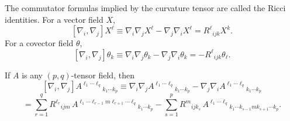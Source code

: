 \begin{remark}
\label{appa-rem-ricci-identities}

The commutator formulas implied by the curvature tensor are called the Ricci identities. For a vector field \(X\),
\[
[\nabla_i,\nabla_j]X^\ell \equiv \nabla_i\nabla_jX^\ell-\nabla_j\nabla_iX^\ell = R^\ell{}_{ijk}X^k.
\]
For a covector field \(\theta\),
\[
[\nabla_i,\nabla_j]\theta_k \equiv \nabla_i\nabla_j\theta_k-\nabla_j\nabla_i\theta_k = -R^\ell{}_{ijk}\theta_\ell.
\]
\end{remark}

\begin{remark}
\label{appa-rem-commutator-general-tensors}

If \(A\) is any \((p,q)\)-tensor field, then
\[
[\nabla_i,\nabla_j]A^{\ell_1\cdots \ell_q}{}_{k_1\cdots k_p}
\equiv \nabla_i\nabla_j A^{\ell_1\cdots \ell_q}{}_{k_1\cdots k_p}
-\nabla_j\nabla_i A^{\ell_1\cdots \ell_q}{}_{k_1\cdots k_p}
\]
\[
= \sum_{r=1}^q R^{\ell_r}{}_{ijm}\,A^{\ell_1\cdots \ell_{r-1}m\ell_{r+1}\cdots \ell_q}{}_{k_1\cdots k_p}
- \sum_{s=1}^p R^{m}{}_{ijk_s}\,A^{\ell_1\cdots \ell_q}{}_{k_1\cdots k_{s-1}mk_{s+1}\cdots k_p}.
\]
\end{remark}
